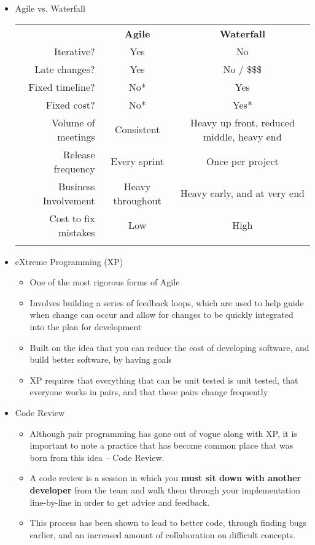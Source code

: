\begin{itemize}
	\item Agile vs. Waterfall\\
		\begin{table}[h]
			\centering
		\begin{tabular}{r | c c |}
			\multicolumn{1}{c}{\phantom{text}}& \multicolumn{1}{c}{\textbf{Agile}} & \multicolumn{1}{c}{\textbf{Waterfall}}\\\hhline{~|--|}
			Iterative? & \cellcolor{green!25}Yes & \cellcolor{green!15}No\\
			Late changes? & \cellcolor{green!25}Yes & \cellcolor{green!15}No / \$\$\$\\
			Fixed timeline? & \cellcolor{green!15}No* & \cellcolor{green!25}Yes\\
			Fixed cost? & \cellcolor{green!15}No* & \cellcolor{green!25}Yes*\\
			Volume of meetings & \cellcolor{green!25}Consistent & Heavy up front, reduced middle, heavy end\\
			Release frequency & \cellcolor{green!25}Every sprint & \cellcolor{green!15}Once per project\\
			Business Involvement & Heavy throughout & Heavy early, and at very end\\
			Cost to fix mistakes & \cellcolor{green!25}Low & \cellcolor{green!15}High\\
			\hhline{~|--|}
		\end{tabular}
		\end{table}

	\item eXtreme Programming (XP)
	\begin{itemize}
		\item One of the most rigorous forms of Agile
		\item Involves building a series of feedback loops, which are used to help guide when change can occur and allow for changes to be quickly integrated into the plan for development
		\item Built on the idea that you can reduce the cost of developing software, and build better software, by having goals
		\item XP requires that everything that can be unit tested is unit tested, that everyone works in pairs, and that these pairs change frequently
	\end{itemize}

	\item Code Review
	\begin{itemize}
		\item Although pair programming has gone out of vogue along with XP, it is important to note a practice that has become common place that was born from this idea -- Code Review.
		\item A code review is a session in which you \textbf{must sit down with another developer} from the team and walk them through your implementation line-by-line in order to get advice and feedback.
		\item This process has been shown to lead to better code, through finding bugs earlier, and an increased amount of collaboration on difficult concepts.
	\end{itemize}


\end{itemize}
